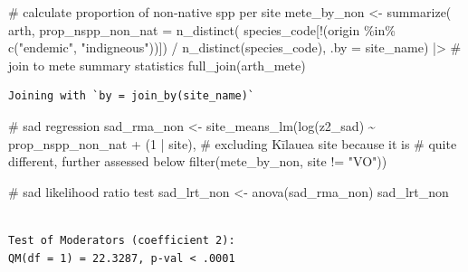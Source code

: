 \documentclass[
  letterpaper,
  DIV=11,
  numbers=noendperiod]{scrartcl}
\newenvironment{Shaded}{\begin{snugshade}}{\end{snugshade}}
\newcommand{\AttributeTok}[1]{\textcolor[rgb]{0.40,0.45,0.13}{#1}}
\newcommand{\CommentTok}[1]{\textcolor[rgb]{0.37,0.37,0.37}{#1}}
\newcommand{\DecValTok}[1]{\textcolor[rgb]{0.68,0.00,0.00}{#1}}
\newcommand{\FunctionTok}[1]{\textcolor[rgb]{0.28,0.35,0.67}{#1}}
\newcommand{\NormalTok}[1]{\textcolor[rgb]{0.00,0.23,0.31}{#1}}
\newcommand{\OtherTok}[1]{\textcolor[rgb]{0.00,0.23,0.31}{#1}}
\newcommand{\SpecialCharTok}[1]{\textcolor[rgb]{0.37,0.37,0.37}{#1}}
\newcommand{\StringTok}[1]{\textcolor[rgb]{0.13,0.47,0.30}{#1}}
\begin{document}
\begin{Shaded}
\begin{Highlighting}[]
\CommentTok{\# calculate proportion of non{-}native spp per site}
\NormalTok{mete\_by\_non }\OtherTok{\textless{}{-}} \FunctionTok{summarize}\NormalTok{(}
\NormalTok{    arth, }
    \AttributeTok{prop\_nspp\_non\_nat =} \FunctionTok{n\_distinct}\NormalTok{(}
\NormalTok{        species\_code[}\SpecialCharTok{!}\NormalTok{(origin }\SpecialCharTok{\%in\%} \FunctionTok{c}\NormalTok{(}\StringTok{"endemic"}\NormalTok{, }\StringTok{"indigneous"}\NormalTok{))]) }\SpecialCharTok{/} 
        \FunctionTok{n\_distinct}\NormalTok{(species\_code),}
    \AttributeTok{.by =}\NormalTok{ site\_name) }\SpecialCharTok{|\textgreater{}} 
    \CommentTok{\# join to mete summary statistics}
    \FunctionTok{full\_join}\NormalTok{(arth\_mete)}
\end{Highlighting}
\end{Shaded}

\begin{verbatim}
Joining with `by = join_by(site_name)`
\end{verbatim}

\begin{Shaded}
\begin{Highlighting}[]
\CommentTok{\# sad regression }
\NormalTok{sad\_rma\_non }\OtherTok{\textless{}{-}} \FunctionTok{site\_means\_lm}\NormalTok{(}\FunctionTok{log}\NormalTok{(z2\_sad) }\SpecialCharTok{\textasciitilde{}}\NormalTok{ prop\_nspp\_non\_nat }\SpecialCharTok{+}\NormalTok{ (}\DecValTok{1} \SpecialCharTok{|}\NormalTok{ site), }
                             \CommentTok{\# excluding Kīlauea site because it is }
                             \CommentTok{\# quite different, further assessed below}
                             \FunctionTok{filter}\NormalTok{(mete\_by\_non, site }\SpecialCharTok{!=} \StringTok{"VO"}\NormalTok{))}

\CommentTok{\# sad likelihood ratio test}
\NormalTok{sad\_lrt\_non }\OtherTok{\textless{}{-}} \FunctionTok{anova}\NormalTok{(sad\_rma\_non)}
\NormalTok{sad\_lrt\_non}
\end{Highlighting}
\end{Shaded}

\begin{verbatim}

Test of Moderators (coefficient 2):
QM(df = 1) = 22.3287, p-val < .0001
\end{verbatim}
\end{document}
